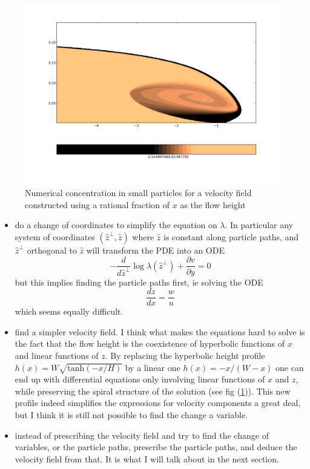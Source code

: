 \documentclass[11pt]{article}
\newcommand{\p}[2]{\ensuremath{\frac{\partial {#1}}{\partial {#2}}}}
\newcommand{\tot}[2]{\ensuremath{\frac{d {#1}}{d {#2}}}}
\newcommand{\lam}{\ensuremath{\lambda}}
\begin{document}
\begin{figure}[htp]
\centering
\includegraphics[scale=0.4]{rational_profile_spiral.png}
\caption{Numerical concentration in small particles for a velocity field constructed using a rational fraction of $x$ as the flow height}
\label{fig:2}
\end{figure}

\begin{itemize}
\item do a change of coordinates to simplify the equation on \lam. In particular any system of coordinates $(\hat z^\perp, \hat z)$ where $\hat z$ is constant along particle paths, and $\hat z^\perp$ orthogonal to $\hat z$ will transform the PDE into an ODE
\begin{equation}
	-\tot{}{\hat z^\perp} \log \lam(\hat z^\perp) + \p{v}{y} = 0
\end{equation}
but this implies finding the particle paths first, ie solving the ODE
\begin{equation}
	\tot{z}{x} = \frac{w}{u}
\end{equation}
which seems equally difficult.
\item find a simpler velocity field. I think what makes the equations hard to solve is the fact that the flow height is the coexistence of hyperbolic functions of $x$ and linear functions of $z$.
By replacing the hyperbolic height profile $h(x) = W \sqrt{ \text{tanh}(-x/H)}$ by a linear one $h(x) = - x/ (W - x) $ one can end up with differential equations only involving linear functions of $x$ and $z$, while preserving the spiral structure of the solution (see fig (\ref{fig:2})).
This new profile indeed simplifies the expressions for velocity components a great deal, but I think it is still not possible to find the change a variable.
\item instead of prescribing the velocity field and try to find the change of variables, or the particle paths, prescribe the particle paths, and deduce the velocity field from that. It is what I will talk about in the next section.
\end{itemize} 
\end{document}
